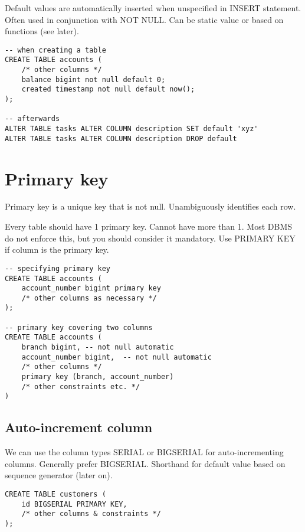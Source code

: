 Default values are automatically inserted when unspecified in INSERT
statement.
Often used in conjunction with NOT NULL.
Can be static value or based on functions (see later).

\begin{verbatim}
-- when creating a table
CREATE TABLE accounts (
    /* other columns */
    balance bigint not null default 0;
    created timestamp not null default now(); 
);

-- afterwards
ALTER TABLE tasks ALTER COLUMN description SET default 'xyz'
ALTER TABLE tasks ALTER COLUMN description DROP default
\end{verbatim}


\section{Primary key}
\label{sec:primary-key}

Primary key is a unique key that is not null.
Unambiguously identifies each row.

Every table should have 1 primary key.
Cannot have more than 1. 
Most DBMS do not enforce this, but you should consider it mandatory.
Use PRIMARY KEY if column is the primary key. 

\begin{verbatim}
-- specifying primary key
CREATE TABLE accounts ( 
    account_number bigint primary key
    /* other columns as necessary */
);

-- primary key covering two columns
CREATE TABLE accounts (
    branch bigint, -- not null automatic
    account_number bigint,  -- not null automatic
    /* other columns */
    primary key (branch, account_number)
    /* other constraints etc. */
)
\end{verbatim}



\subsection{Auto-increment column}
\label{sec:auto-increment-column}

We can use the column types SERIAL or BIGSERIAL for auto-incrementing columns.
Generally prefer BIGSERIAL.
Shorthand for default value based on sequence generator (later on).

\begin{verbatim}
CREATE TABLE customers ( 
    id BIGSERIAL PRIMARY KEY,
    /* other columns & constraints */
);
\end{verbatim}



